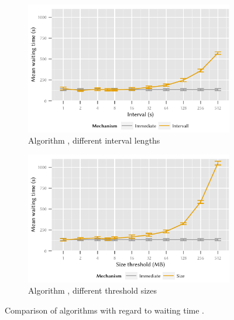 \begin{figure}
	\begin{subfigure}[b]{\textwidth}
	\centering
	\includegraphics{application/cloud_file_synchronization/numerical_evaluation/figures/interval_delay}
	\caption{Algorithm \algointerval, different interval lengths}\label{fig:application:cloud_file_synchronisation:numerical_evaluation:waiting_time:waiting_time:interval}
	\end{subfigure} 
	\begin{subfigure}[b]{\textwidth}
	\centering
	\includegraphics{application/cloud_file_synchronization/numerical_evaluation/figures/size_delay}
	\caption{Algorithm \algosize, different threshold sizes}\label{fig:application:cloud_file_synchronisation:numerical_evaluation:waiting_time:waiting_time:size}
	\end{subfigure}

	\caption{Comparison of algorithms with regard to waiting time \sojournTime.}\label{fig:application:cloud_file_synchronisation:numerical_evaluation:waiting_time:waiting_time}
\end{figure}

